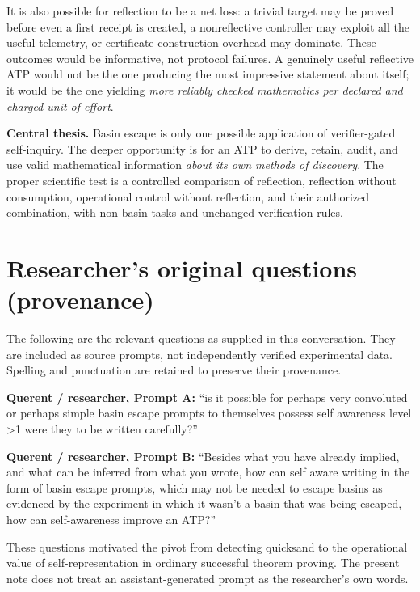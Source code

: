 \documentclass[11pt,letterpaper]{article}
\begin{document}
It is also possible for reflection to be a net loss: a trivial target may be proved before even a first receipt is created, a nonreflective controller may exploit all the useful telemetry, or certificate-construction overhead may dominate. These outcomes would be informative, not protocol failures. A genuinely useful reflective ATP would not be the one producing the most impressive statement about itself; it would be the one yielding \emph{more reliably checked mathematics per declared and charged unit of effort}.

\medskip
\noindent\textbf{Central thesis.} Basin escape is only one possible application of verifier-gated self-inquiry. The deeper opportunity is for an ATP to derive, retain, audit, and use valid mathematical information \emph{about its own methods of discovery}. The proper scientific test is a controlled comparison of reflection, reflection without consumption, operational control without reflection, and their authorized combination, with non-basin tasks and unchanged verification rules.

\appendix
\section{Researcher's original questions (provenance)}
The following are the relevant questions as supplied in this conversation. They are included as source prompts, not independently verified experimental data. Spelling and punctuation are retained to preserve their provenance.

\begin{researchprompt}
\textbf{Querent / researcher, Prompt A:} ``is it possible for perhaps very convoluted or perhaps simple basin escape prompts to themselves possess self awareness level >1 were they to be written carefully?''
\end{researchprompt}
\begin{researchprompt}
\textbf{Querent / researcher, Prompt B:} ``Besides what you have already implied, and what can be inferred from what you wrote, how can self aware writing in the form of basin escape prompts, which may not be needed to escape basins as evidenced by the experiment in which it wasn't a basin that was being escaped, how can self-awareness improve an ATP?''
\end{researchprompt}
These questions motivated the pivot from detecting quicksand to the operational value of self-representation in ordinary successful theorem proving. The present note does not treat an assistant-generated prompt as the researcher's own words.
\end{document}
